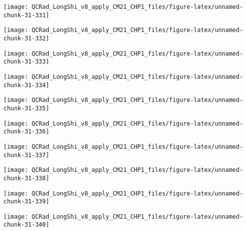 \documentclass[
  10pt,
  a4paper,oneside]{article}
\begin{document}
\begin{center}\texttt{[image: QCRad\_LongShi\_v8\_apply\_CM21\_CHP1\_files/figure-latex/unnamed-chunk-31-331]} \end{center}

\begin{center}\texttt{[image: QCRad\_LongShi\_v8\_apply\_CM21\_CHP1\_files/figure-latex/unnamed-chunk-31-332]} \end{center}

\begin{center}\texttt{[image: QCRad\_LongShi\_v8\_apply\_CM21\_CHP1\_files/figure-latex/unnamed-chunk-31-333]} \end{center}

\begin{center}\texttt{[image: QCRad\_LongShi\_v8\_apply\_CM21\_CHP1\_files/figure-latex/unnamed-chunk-31-334]} \end{center}

\begin{center}\texttt{[image: QCRad\_LongShi\_v8\_apply\_CM21\_CHP1\_files/figure-latex/unnamed-chunk-31-335]} \end{center}

\begin{center}\texttt{[image: QCRad\_LongShi\_v8\_apply\_CM21\_CHP1\_files/figure-latex/unnamed-chunk-31-336]} \end{center}

\begin{center}\texttt{[image: QCRad\_LongShi\_v8\_apply\_CM21\_CHP1\_files/figure-latex/unnamed-chunk-31-337]} \end{center}

\begin{center}\texttt{[image: QCRad\_LongShi\_v8\_apply\_CM21\_CHP1\_files/figure-latex/unnamed-chunk-31-338]} \end{center}

\begin{center}\texttt{[image: QCRad\_LongShi\_v8\_apply\_CM21\_CHP1\_files/figure-latex/unnamed-chunk-31-339]} \end{center}

\begin{center}\texttt{[image: QCRad\_LongShi\_v8\_apply\_CM21\_CHP1\_files/figure-latex/unnamed-chunk-31-340]} \end{center}
\end{document}
